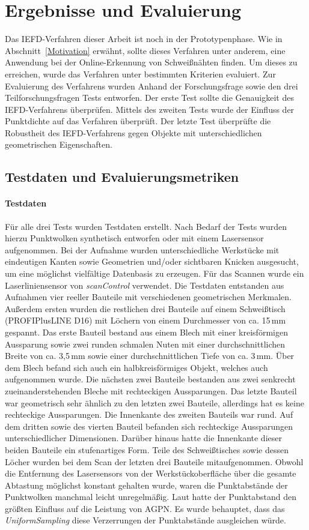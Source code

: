 \chapter{Ergebnisse und Evaluierung}
Das IEFD-Verfahren dieser Arbeit ist noch in der Prototypenphase. Wie in Abschnitt~\ref{Motivation} erwähnt, sollte dieses Verfahren unter anderem, eine Anwendung bei der Online-Erkennung von Schweißnähten finden. Um dieses zu erreichen, wurde das Verfahren unter bestimmten Kriterien evaluiert. Zur Evaluierung des Verfahrens wurden Anhand der Forschungsfrage sowie den drei Teilforschungsfragen Tests entworfen. Der erste Test sollte die Genauigkeit des IEFD-Verfahrens überprüfen. Mittels des zweiten Tests wurde der Einfluss der Punktdichte auf das Verfahren überprüft. Der letzte Test überprüfte die Robustheit des IEFD-Verfahrens gegen Objekte mit unterschiedlichen geometrischen Eigenschaften.

\section{Testdaten und Evaluierungsmetriken}
\subsubsection{Testdaten}\label{test_data}
Für alle drei Tests wurden Testdaten erstellt. Nach Bedarf der Tests wurden hierzu Punktwolken synthetisch entworfen oder mit einem Lasersensor aufgenommen. Bei der Aufnahme wurden unterschiedliche Werkstücke mit eindeutigen Kanten sowie Geometrien und/oder sichtbaren Knicken ausgesucht, um eine möglichst vielfältige Datenbasis zu erzeugen. Für das Scannen wurde ein Laserliniensensor von \textit{scanControl} verwendet. Die Testdaten entstanden aus Aufnahmen vier reeller Bauteile mit verschiedenen geometrischen Merkmalen. Außerdem ersten wurden die restlichen drei Bauteile auf einem Schweißtisch (PROFIPlusLINE D16) mit Löchern von einem Durchmesser von ca. 15\,mm gespannt. Das erste Bauteil bestand aus einem Blech mit einer kreisförmigen Aussparung sowie zwei runden schmalen Nuten mit einer durchschnittlichen Breite von ca. 3,5\,mm sowie einer durchschnittlichen Tiefe von ca. 3\,mm. Über dem Blech befand sich auch ein halbkreisförmiges Objekt, welches auch aufgenommen wurde. Die nächsten zwei Bauteile bestanden aus zwei senkrecht zueinanderstehenden Bleche mit rechteckigen Aussparungen. Das letzte Bauteil war geometrisch sehr ähnlich zu den letzten zwei Bauteile, allerdings hat es keine rechteckige Aussparungen. Die Innenkante des zweiten Bauteils war rund. Auf dem dritten sowie des vierten Bauteil befanden sich rechteckige Aussparungen unterschiedlicher Dimensionen. Darüber hinaus hatte die Innenkante dieser beiden Bauteile ein stufenartiges Form. Teile des Schweißtisches sowie dessen Löcher wurden bei dem Scan der letzten drei Bauteile mitaufgenommen. Obwohl die Entfernung des Lasersensors von der Werkstückoberfläche über die gesamte Abtastung möglichst konstant gehalten wurde, waren die Punktabstände der Punktwolken manchmal leicht unregelmäßig. Laut \textcite[9]{ni_edge_2016} hatte der Punktabstand den größten Einfluss auf die Leistung von AGPN. Es wurde behauptet, dass das \textit{UniformSampling} diese Verzerrungen der Punktabstände ausgleichen würde. 

